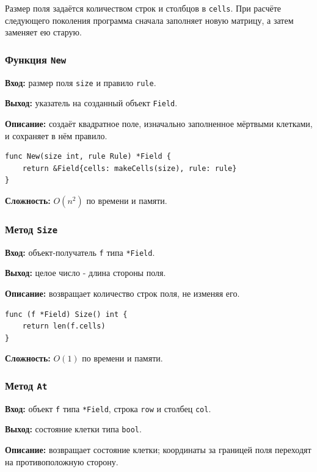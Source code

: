 Размер поля задаётся количеством строк и столбцов в \texttt{cells}. При
расчёте следующего поколения программа сначала заполняет новую матрицу, а
затем заменяет ею старую.

\subsubsection{Функция \texttt{New}}
\textbf{Вход:} размер поля \texttt{size} и правило \texttt{rule}.

\textbf{Выход:} указатель на созданный объект \texttt{Field}.

\textbf{Описание:} создаёт квадратное поле, изначально заполненное мёртвыми
клетками, и сохраняет в нём правило.

\begin{lstlisting}[style=gostyle,caption={Создание пустого поля}]
func New(size int, rule Rule) *Field {
    return &Field{cells: makeCells(size), rule: rule}
}
\end{lstlisting}

\textbf{Сложность:} $O(n^2)$ по времени и памяти.

\subsubsection{Метод \texttt{Size}}
\textbf{Вход:} объект-получатель \texttt{f} типа \texttt{*Field}.

\textbf{Выход:} целое число - длина стороны поля.

\textbf{Описание:} возвращает количество строк поля, не изменяя его.

\begin{lstlisting}[style=gostyle,caption={Получение размера поля}]
func (f *Field) Size() int {
    return len(f.cells)
}
\end{lstlisting}

\textbf{Сложность:} $O(1)$ по времени и памяти.

\subsubsection{Метод \texttt{At}}
\textbf{Вход:} объект \texttt{f} типа \texttt{*Field}, строка
\texttt{row} и столбец \texttt{col}.

\textbf{Выход:} состояние клетки типа \texttt{bool}.

\textbf{Описание:} возвращает состояние клетки; координаты за границей поля
переходят на противоположную сторону.

